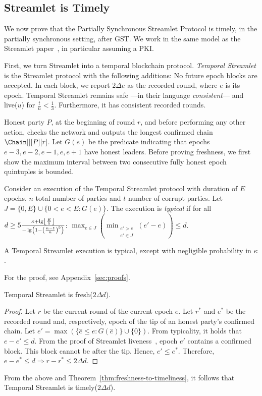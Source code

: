 \subsection{Streamlet is Timely}

We now prove that the Partially Synchronous Streamlet Protocol is timely,
in the partially synchronous setting, after GST.
We work in the same model as the Streamlet paper~\cite{streamlet},
in particular assuming a PKI.

First, we turn Streamlet into a temporal blockchain protocol.
\emph{Temporal Streamlet} is the Streamlet protocol with the
following additions: No future epoch blocks are accepted. In each block, we report
$2\Delta e$ as the recorded round, where $e$ is its epoch.
Temporal Streamlet remains safe ---in their language \emph{consistent}--- and live($u$)
for $\frac{t}{n} < \frac{1}{3}$. Furthermore, it has consistent recorded rounds.

Honest party $P$, at the beginning of round $r$, and
before performing any other action, checks the network and
outputs the longest confirmed chain $\Chain[][P][r]$.
Let $G(e)$ be the predicate indicating that epochs $e-3,e-2,e-1,e,e+1$ have honest leaders.
Before proving freshness, we first show the maximum interval between two consecutive fully
honest epoch quintuples is bounded.

\begin{definition}
  Consider an execution of the Temporal Streamlet protocol with duration
  of $E$ epochs, $n$ total number of parties and $t$ number of corrupt parties.
  Let $J = \{0,E\} \cup \{0 < e < E: G(e)\}$.
  The execution is \emph{typical} if for all
  $d \geq 5\frac{\kappa + \lg \floor*{\frac{E}{5}}}{- \lg \left(1 - \left(\frac{n - t}{n}\right)^5\right)}$:
  $\max_{e \in J}(\min_{\substack{e' > e \\ e' \in J}}(e' - e)) \leq d$.
\end{definition}

\begin{lemma} \label{lem:honest-quintuple}
  A Temporal Streamlet execution is typical, except with negligible probability in $\kappa$.
\end{lemma}

For the proof, see Appendix~\ref{sec:proofs}.

\begin{theorem} \label{thm.streamlet-freshness}
  Temporal Streamlet is fresh($2\Delta d$).
\end{theorem}
\begin{proof}
  Let $r$ be the current round of the current epoch $e$.
  Let $r^*$ and $e^*$ be the recorded round and, respectively, epoch of the tip
  of an honest party's confirmed chain.
  Let $e' = \max(\{\hat e \leq e: G(\hat e)\} \cup \{0\})$.
  From typicality, it holds that $e - e' \leq d$.
  From the proof of Streamlet liveness~\cite[Theorem 6]{streamlet}, epoch $e'$ contains a confirmed
  block. This block cannot be after the tip.
  Hence, $e' \leq e^*$. Therefore, $e - e^* \leq d \Rightarrow r - r^* \leq 2\Delta d$.
  \Qed
\end{proof}

From the above and Theorem~\ref{thm:freshness-to-timeliness}, it follows that
Temporal Streamlet is timely($2\Delta d$).
